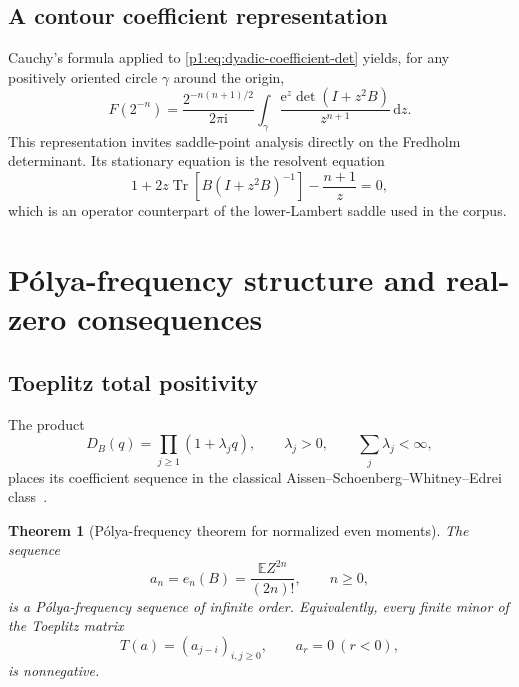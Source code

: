 \documentclass[11pt,oneside]{article}
\newtheorem{theorem}{Theorem}[section]
\theoremstyle{definition}
\newcommand{\dd}{\,\mathrm d}
\newcommand{\e}{\mathrm e}
\newcommand{\ii}{\mathrm i}
\newcommand{\E}{\mathbb E}
\newcommand{\Tr}{\operatorname{Tr}}
\begin{document}
\subsection{A contour coefficient representation}

Cauchy's formula applied to \eqref{p1:eq:dyadic-coefficient-det} yields, for any
positively oriented circle \(\gamma\) around the origin,
\begin{equation}
 F(2^{-n})=\frac{2^{-n(n+1)/2}}{2\pi\ii}
 \int_{\gamma}\frac{\e^z\det(I+z^2B)}{z^{n+1}}\dd z.
 \label{p1:eq:dyadic-Cauchy}
\end{equation}
This representation invites saddle-point analysis directly on the Fredholm
determinant.  Its stationary equation is the resolvent equation
\begin{equation}
 1+2z\Tr[B(I+z^2B)^{-1}]-\frac{n+1}{z}=0,
 \label{p1:eq:operator-saddle}
\end{equation}
which is an operator counterpart of the lower-Lambert saddle used in the corpus.

\section{P\'olya-frequency structure and real-zero consequences}
\label{p1:sec:PF}

\subsection{Toeplitz total positivity}

The product
\begin{equation}
 D_B(q)=\prod_{j\ge1}(1+\lambda_jq),
 \qquad \lambda_j>0,
 \qquad \sum_j\lambda_j<\infty,
 \label{p1:eq:DB-positive-product}
\end{equation}
places its coefficient sequence in the classical Aissen--Schoenberg--Whitney--Edrei
class~\cite{p1:ASW1952,p1:Edrei1952,p1:Schoenberg1951}.

\begin{theorem}[P\'olya-frequency theorem for normalized even moments]
\label{p1:thm:PF}
The sequence
\begin{equation}
 a_n=e_n(B)=\frac{\E Z^{2n}}{(2n)!},\qquad n\ge0,
 \label{p1:eq:an-PF}
\end{equation}
is a P\'olya-frequency sequence of infinite order.  Equivalently, every finite minor
of the Toeplitz matrix
\begin{equation}
 T(a)=(a_{j-i})_{i,j\ge0},\qquad a_r=0\ (r<0),
 \label{p1:eq:Toeplitz-a}
\end{equation}
is nonnegative.
\end{theorem}
\end{document}
